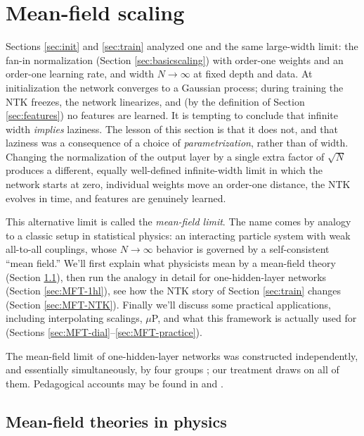 \documentclass[11pt]{article}
\begin{document}
\section{Mean-field scaling}
\label{sec:MFT}

Sections \ref{sec:init} and \ref{sec:train} analyzed one and the same large-width limit: the fan-in normalization (Section \ref{sec:basicscaling}) with order-one weights and an order-one learning rate, and width $N\to\infty$ at fixed depth and data. At initialization the network converges to a Gaussian process; during training the NTK freezes, the network linearizes, and (by the definition of Section \ref{sec:features}) no features are learned. It is tempting to conclude that infinite width \emph{implies} laziness. The lesson of this section is that it does not, and that laziness was a consequence of a choice of \emph{parametrization}, rather than of width. Changing the normalization of the output layer by a single extra factor of $\sqrt N$ produces a different, equally well-defined infinite-width limit in which the network starts at zero, individual weights move an order-one distance, the NTK evolves in time, and features are genuinely learned.

This alternative limit is called the \emph{mean-field limit}. The name comes by analogy to a classic setup in statistical physics: an interacting particle system with weak all-to-all couplings, whose $N\to\infty$ behavior is governed by a self-consistent ``mean field.''
We'll first explain what physicists mean by a mean-field theory (Section \ref{sec:MFT-physics}), then run the analogy in detail for one-hidden-layer networks (Section \ref{sec:MFT-1hl}), see how the NTK story of Section \ref{sec:train} changes (Section \ref{sec:MFT-NTK}).
Finally we'll discuss some practical applications, including interpolating scalings, $\mu$P, and what this framework is actually used for (Sections \ref{sec:MFT-dial}--\ref{sec:MFT-practice}).

The mean-field limit of one-hidden-layer networks was constructed independently, and essentially simultaneously, by four groups \cite{mei2018mean,chizat2018global,rotskoff2022trainability,sirignano2020mean}; our treatment draws on all of them. Pedagogical accounts may be found in \cite[Ch. 20]{spiliopoulos2025foundations} and \cite[Lecture 4]{hanin2026mdl}.




\subsection{Mean-field theories in physics}
\label{sec:MFT-physics}
\end{document}
